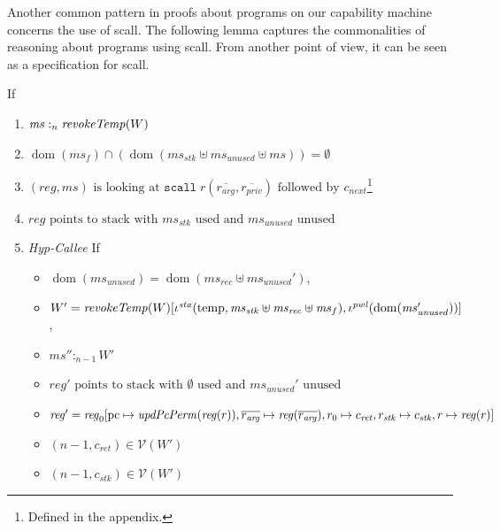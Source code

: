 \documentclass[format=acmsmall, review=true, screen=true]{acmart}
\DeclareMathOperator{\dom}{dom}
\newcommand{\var}[1]{\mathit{#1}}
\newcommand{\hs}{\var{ms}}
\newcommand{\ms}{\hs}
\newcommand{\pcreg}{\mathrm{pc}}
\newcommand{\reg}{\var{reg}}
\newcommand{\heap}{\var{mem}}
\newcommand{\stk}{\var{stk}}
\newcommand{\pwl}{\var{pwl}}
\newcommand{\sta}{\var{sta}}
\newcommand{\plainfun}[2]{
  \ifthenelse{\equal{#2}{}}
  {\mathit{#1}}
  {\mathit{#1}(#2)}
}
\newcommand{\updatePcPerm}[1]{\plainfun{updPcPerm}{#1}}
\newcommand{\revokeTemp}[1]{\plainfun{revokeTemp}{#1}}
\newcommand{\heapSat}[3][\heap]{#1 :_{#2} #3}
\newcommand{\memSat}[3][n]{\heapSat[#2]{#1}{#3}}
\newcommand{\asmType}{\plaindom{AsmType}}
\newcommand{\plaindom}[1]{\mathrm{#1}}
\newcommand{\intr}[2]{\mathcal{#1}}
\newcommand{\valueintr}[1]{\intr{V}{#1}}
\newcommand{\stdvr}{\valueintr{\asmType}}
\newcommand{\npair}[2][n]{\left(#1,#2 \right)}
\newcommand{\plainview}[1]{\mathrm{#1}}
\newcommand{\temp}{\plainview{temp}}
\newenvironment{toplas}{}{}
\begin{document}
\begin{toplas}
Another common pattern in proofs about programs on our capability machine
concerns the use of scall. The following lemma captures the commonalities of
reasoning about programs using scall. From another point of view, it can be seen
as a specification for scall.
\begin{lemma}
  \label{lem:scall-works}
  If
  \begin{enumerate}
  \item \label{item:scall:memsat} $\memSat[n]{\ms}{\revokeTemp{W}}$ 
  \item $\dom(\ms_f) \cap (\dom(\ms_\stk \uplus \ms_{\mathit{unused}} \uplus \ms)) = \emptyset$
  \item \label{item:scall:stack} $(\reg,\ms) \text{ is looking at }
    \mathtt{scall}\;r(\overline{r_{\mathit{arg}}},
    \overline{r_{\mathit{priv}}}) \text{ followed by }
    c_{\mathit{next}}$\footnote{Defined in the appendix.}
  \item $\reg \text{ points to stack with $\ms_\stk$ used and $\ms_{\mathit{unused}}$ unused}$
  \item \label{item:scall:hyp-callee} \emph{Hyp-Callee} If
    \begin{itemize}
    \item $\dom(\ms_{\mathit{unused}}) = \dom(\ms_{\mathit{rec}}
      \uplus \ms_{\mathit{unused}}')$,
    \item $W' =
      \revokeTemp{W}[\iota^{\sta}(\temp,\ms_\stk\uplus\ms_{\mathit{rec}} \uplus \ms_f),\iota^{\pwl}(\dom(\ms_{\mathit{unused}}'))]$,
    \item $\memSat[n-1]{\ms''}{W'}$
    \item $\reg' \text{ points to stack with $\emptyset$ used and $\ms_{\mathit{unused}}'$ unused}$
    \item $\reg'= \reg_0[\pcreg\mapsto\updatePcPerm{\reg(r)},
      \overline{r_{\mathit{arg}}} \mapsto \reg(\overline{r_{\mathit{arg}}}),r_0
      \mapsto c_{\mathit{ret}}, r_\stk \mapsto c_\stk, r \mapsto \reg(r)]$ 
    \item $\npair[n-1]{c_{\mathit{ret}}} \in \stdvr(W')$
    \item $\npair[n-1]{c_\stk} \in \stdvr(W')$
    \end{itemize}


\end{enumerate}
\end{lemma}
\end{toplas}
\end{document}
